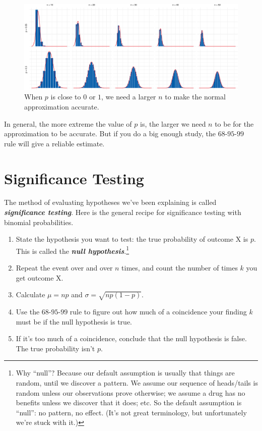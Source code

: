 \documentclass[justified]{tufte-book}
\theoremstyle{definition}
\theoremstyle{definition}
\theoremstyle{definition}
\theoremstyle{definition}
\theoremstyle{remark}
\begin{document}
\begin{figure}
\includegraphics{_main_files/figure-latex/npgrid-1} \caption[When $p$ is close to $0$ or $1$, we need a larger $n$ to make the normal approximation accurate]{When $p$ is close to $0$ or $1$, we need a larger $n$ to make the normal approximation accurate.}\label{fig:npgrid}
\end{figure}

In general, the more extreme the value of \(p\) is, the larger we need \(n\) to be for the approximation to be accurate. But if you do a big enough study, the \(68\)-\(95\)-\(99\) rule will give a reliable estimate.

\hypertarget{foobar}{%
\section{Significance Testing}\label{foobar}}

The method of evaluating hypotheses we've been explaining is called \textbf{\emph{significance testing}}. Here is the general recipe for significance testing with binomial probabilities.

\begin{enumerate}
\def\labelenumi{\arabic{enumi}.}
\item
  State the hypothesis you want to test: the true probability of outcome X is \(p\). This is called the \textbf{\emph{null hypothesis}}.\footnote{Why ``null''? Because our default assumption is usually that things are random, until we discover a pattern. We assume our sequence of heads/tails is random unless our observations prove otherwise; we assume a drug has no benefits unless we discover that it does; etc. So the default assumption is ``null'': no pattern, no effect. (It's not great terminology, but unfortunately we're stuck with it.)}
\item
  Repeat the event over and over \(n\) times, and count the number of times \(k\) you get outcome X.
\item
  Calculate \(\mu = np\) and \(\sigma = \sqrt{np(1-p)}\).
\item
  Use the \(68\)-\(95\)-\(99\) rule to figure out how much of a coincidence your finding \(k\) must be if the null hypothesis is true.
\item
  If it's too much of a coincidence, conclude that the null hypothesis is false. The true probability isn't \(p\).
\end{enumerate}
\end{document}
